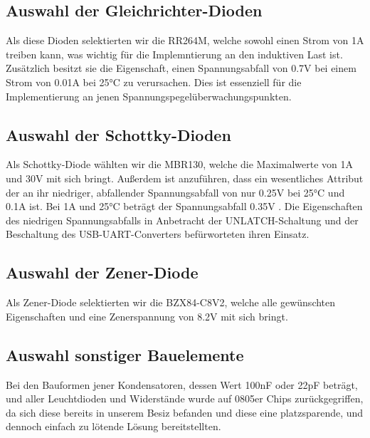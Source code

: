 \subsection{Auswahl der Gleichrichter-Dioden}

Als diese Dioden selektierten wir die RR264M, welche sowohl einen Strom von 1A treiben kann, was wichtig für die Implemntierung an den induktiven Last ist.
Zusätzlich besitzt sie die Eigenschaft, einen Spannungsabfall von 0.7V bei einem Strom von 0.01A bei 25°C zu verursachen.
Dies ist essenziell für die Implementierung an jenen Spannungspegelüberwachungspunkten.

\subsection{Auswahl der Schottky-Dioden}

Als Schottky-Diode wählten wir die MBR130, welche die Maximalwerte von 1A und 30V mit sich bringt.
Außerdem ist anzuführen, dass ein wesentliches Attribut der an ihr niedriger, abfallender Spannungsabfall von nur 0.25V bei 25°C und 0.1A ist.
Bei 1A und 25°C beträgt der Spannungsabfall 0.35V .
Die Eigenschaften des niedrigen Spannungsabfalls in Anbetracht der UNLATCH-Schaltung und der Beschaltung des USB-UART-Converters befürworteten ihren Einsatz.

\subsection{Auswahl der Zener-Diode}

Als Zener-Diode selektierten wir die BZX84-C8V2, welche alle gewünschten Eigenschaften und eine Zenerspannung von 8.2V mit sich bringt.

\subsection{Auswahl sonstiger Bauelemente}

Bei den Bauformen jener Kondensatoren, dessen Wert 100nF oder 22pF beträgt, und aller Leuchtdioden und Widerstände wurde auf 0805er Chips zurückgegriffen,
da sich diese bereits in unserem Besiz befanden und diese eine platzsparende, und dennoch einfach zu lötende Lösung bereitstellten.


\newpage
